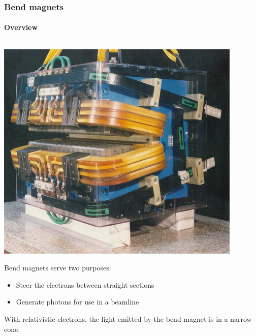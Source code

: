 \documentclass[10pt, xcolor=x11names, compress]{beamer}
\begin{document}
\begin{frame}
  \frametitle{Bend magnets}
  \framesubtitle{Overview}
  \begin{columns}
    \begin{column}{0.65\linewidth}
      \begin{center}
        \includegraphics[width=0.7\linewidth]{synch/ALSbend.jpg}
      \end{center}
      
      \small

      Bend magnets serve two purposes:
      \begin{itemize}
      \item Steer the electrons between straight sections
      \item Generate photons for use in a beamline
      \end{itemize}
      With relativistic electrons, the light emitted by
      the bend magnet is in a narrow cone.


\end{column}
\end{columns}
\end{frame}
\end{document}
